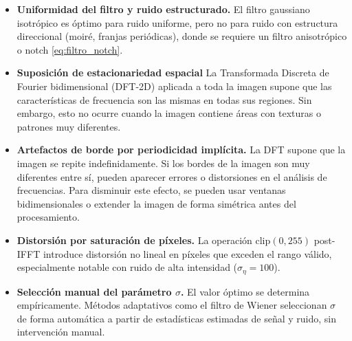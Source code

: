\documentclass[conference]{IEEEtran}
\begin{document}
\begin{itemize}

\item \textbf{Uniformidad del filtro y ruido estructurado.}
El filtro gaussiano isotrópico es óptimo para ruido uniforme, pero no para
ruido con estructura direccional (moiré, franjas periódicas), donde se
requiere un filtro anisotrópico o notch \eqref{eq:filtro_notch}.

\item \textbf{Suposición de estacionariedad espacial}
La Transformada Discreta de Fourier bidimensional (DFT-2D) aplicada a toda la imagen supone que las características de frecuencia son las mismas en todas sus regiones. Sin embargo, esto no ocurre cuando la imagen contiene áreas con texturas o patrones muy diferentes.

\item \textbf{Artefactos de borde por periodicidad implícita.}
La DFT supone que la imagen se repite indefinidamente. Si los bordes de la imagen son muy diferentes entre sí, pueden aparecer errores o distorsiones en el análisis de frecuencias. Para disminuir este efecto, se pueden usar ventanas bidimensionales o extender la imagen de forma simétrica antes del procesamiento.

\item \textbf{Distorsión por saturación de píxeles.}
La operación $\text{clip}(0, 255)$ post-IFFT introduce distorsión
no lineal en píxeles que exceden el rango válido, especialmente notable
con ruido de alta intensidad ($\sigma_\eta = 100$).

\item \textbf{Selección manual del parámetro $\sigma$.}
El valor óptimo se determina empíricamente. Métodos adaptativos como el
filtro de Wiener seleccionan $\sigma$ de forma automática a partir de
estadísticas estimadas de señal y ruido, sin intervención manual.


\end{itemize}
\end{document}
